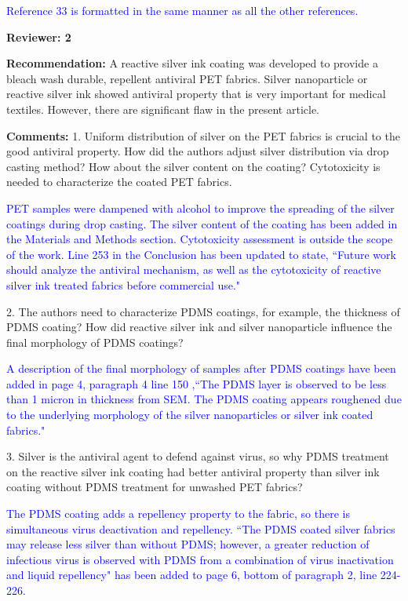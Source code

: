\documentclass[12pt]{letter}
\newcommand{\blue}[1]{\textcolor{blue}{#1}} %
\begin{document}
\blue{Reference 33 is formatted in the same manner as all the other references.}

\newpage
\textbf{Reviewer: 2}

\textbf{Recommendation:} A reactive silver ink coating was developed to provide a bleach wash durable, repellent antiviral PET fabrics. Silver nanoparticle or reactive silver ink showed antiviral property that is very important for medical textiles. However, there are significant flaw in the present article.

\textbf{Comments:} 
1. Uniform distribution of silver on the PET fabrics is crucial to the good antiviral property. How did the authors adjust silver distribution via drop casting method? How about the silver content on the coating? Cytotoxicity is needed to characterize the coated PET fabrics.

\blue{PET samples were dampened with alcohol to improve the spreading of the silver coatings during drop casting. The silver content of the coating has been added in the Materials and Methods section. Cytotoxicity assessment is outside the scope of the work.  Line 253 in the Conclusion has been updated to state, ``Future work should analyze the antiviral mechanism, as well as the cytotoxicity of reactive silver ink treated fabrics before
commercial use."}

2. The authors need to characterize PDMS coatings, for example, the thickness of PDMS coating? How did reactive silver ink and silver nanoparticle influence the final morphology of PDMS coatings?

\blue{A description of the final morphology of samples after PDMS coatings have been added in page 4, paragraph 4 line 150 ,``The PDMS layer is observed to be less than 1 micron in thickness from SEM. The PDMS
coating appears roughened due to the underlying morphology of the silver nanoparticles
or silver ink coated fabrics." }

3. Silver is the antiviral agent to defend against virus, so why PDMS treatment on the reactive silver ink coating had better antiviral property than silver ink coating without PDMS treatment for unwashed PET fabrics?

\blue{The PDMS coating adds a repellency property to the fabric, so there is simultaneous virus deactivation and repellency. ``The PDMS coated silver 
fabrics may release less silver than without PDMS; however, a greater reduction of 
infectious virus is observed with PDMS from a combination of virus inactivation and 
liquid repellency" has been added to page 6, bottom of paragraph 2, line 224-226.}
\end{document}
